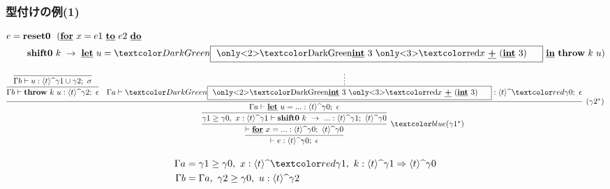 \begin{frame}
  \frametitle{型付けの例(1)}
  \begin{align*}
    e & = \Resetz ~~(\cfordo{x = e1}{e2} \\
      & \phantom{=}~~~ \Shiftz~k~\to~
        {\cLet~u=\green{\boxterm}~\cIn}~\Throw~k~u)
  \end{align*}

  \[
    \infer{\vdash e : \codeTs{t}{\gamma0};~\epsilon}
    {\infer[\blue{(\gamma1^*)}]{\vdash \cfor{x=...} :
        \codeTs{t}{\gamma0};~\codeTs{t}{\gamma0}}
      {\infer{\gamma1 \ord \gamma0,~x:\codeTs{t}{\gamma1}
          \vdash \Shiftz~k~\to~... :
          \codeTs{t}{\gamma1};~\codeTs{t}{\gamma0}}
        {\infer[(\gamma2^*)]{\Gamma a \vdash \cLet~u=...:\codeTs{t}{\gamma0};~\epsilon}
          {\infer{\Gamma b \vdash
              \Throw~k~u:\codeTs{t}{\gamma2};~\epsilon }
            {\infer{\Gamma b \vdash
                u:\codeTs{t}{\gamma1 \cup \gamma2};~ \sigma}
              {}
            }
            &\infer*{\Gamma a \vdash
              \green{\boxterm}:\codeTs{t}{\red{\gamma0}};~\epsilon}
            {}
          }
        }
      }
    }
  \]


  {\footnotesize
    \begin{align*}
      \Gamma a &= \gamma1 \ord \gamma0,~x:\codeTs{t}{\red{\gamma1}},
                 ~k: \contT{\codeTs{t}{\gamma1}}{\codeTs{t}{\gamma0}} \\
      \Gamma b &= \Gamma a,~\gamma2 \ord \gamma0,~u:\codeTs{t}{\gamma2}
    \end{align*}
  }

\end{frame}

